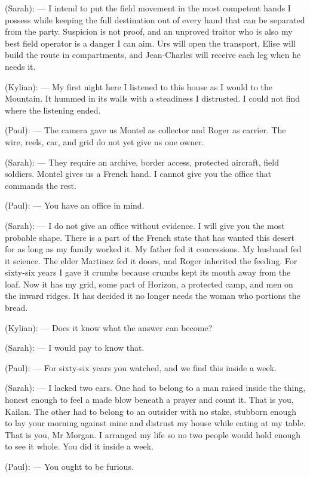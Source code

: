 \begin{room}
(Sarah): --- I intend to put the field movement in the most competent hands I possess while keeping the full destination out of every hand that can be separated from the party. Suspicion is not proof, and an unproved traitor who is also my best field operator is a danger I can aim. Urs will open the transport, Elise will build the route in compartments, and Jean-Charles will receive each leg when he needs it.

(Kylian): --- My first night here I listened to this house as I would to the Mountain. It hummed in its walls with a steadiness I distrusted. I could not find where the listening ended.

(Paul): --- The camera gave us Montel as collector and Roger as carrier. The wire, reels, car, and grid do not yet give us one owner.

(Sarah): --- They require an archive, border access, protected aircraft, field soldiers. Montel gives us a French hand. I cannot give you the office that commands the rest.

(Paul): --- You have an office in mind.

(Sarah): --- I do not give an office without evidence. I will give you the most probable shape. There is a part of the French state that has wanted this desert for as long as my family worked it. My father fed it concessions. My husband fed it science. The elder Martinez fed it doors, and Roger inherited the feeding. For sixty-six years I gave it crumbs because crumbs kept its mouth away from the loaf. Now it has my grid, some part of Horizon, a protected camp, and men on the inward ridges. It has decided it no longer needs the woman who portions the bread.

(Kylian): --- Does it know what the answer can become?

(Sarah): --- I would pay to know that.

(Paul): --- For sixty-six years you watched, and we find this inside a week.

(Sarah): --- I lacked two ears. One had to belong to a man raised inside the thing, honest enough to feel a made blow beneath a prayer and count it. That is you, Kailan. The other had to belong to an outsider with no stake, stubborn enough to lay your morning against mine and distrust my house while eating at my table. That is you, Mr Morgan. I arranged my life so no two people would hold enough to see it whole. You did it inside a week.

(Paul): --- You ought to be furious.


\end{room}
